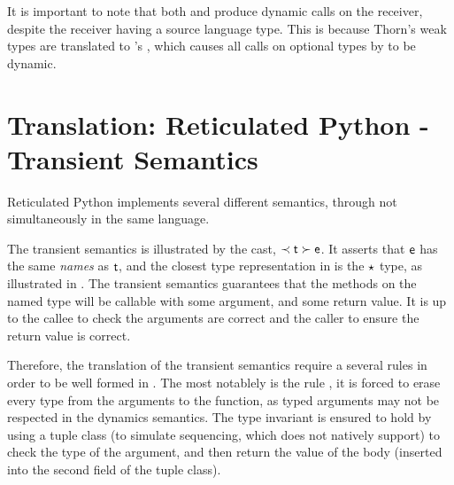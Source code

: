 \documentclass[a4paper,USenglish]{tex/lipics-v2016}
\begin{document}
It is important to note that both  and  produce dynamic calls on the receiver, despite the 
receiver having a source language type. This is because Thorn's weak types are translated to \kafka's \any, which causes 
all calls on optional types by \kafka to be dynamic.

\hrulefill

\begin{mathpar}




\end{mathpar}


\section{Translation: Reticulated Python - Transient Semantics}

Reticulated Python implements several different semantics, through not simultaneously in the same language. 

The transient semantics is illustrated by the cast, $\ShaCast\t\e$. It asserts that $\e$ has the same \emph{names} as $\t$,
and the closest type representation in \kafka is the $\any$ type, as illustrated in . The transient semantics 
guarantees that the methods on the named type will be callable with some argument, and some return value. It is up to 
the callee to check the arguments are correct and the caller to ensure the return value is correct.

Therefore, the translation of the transient semantics require a several rules in order to be well formed in \kafka. 
The most notablely is the rule , it is forced to erase every type from the arguments to the function, 
as typed arguments may not be respected in the dynamics semantics. The type invariant is ensured to hold by using 
a tuple class (to simulate sequencing, which \kafka does not natively support) to check the type of the argument, and then return 
the value of the body (inserted into the second field of the tuple class).
\end{document}
